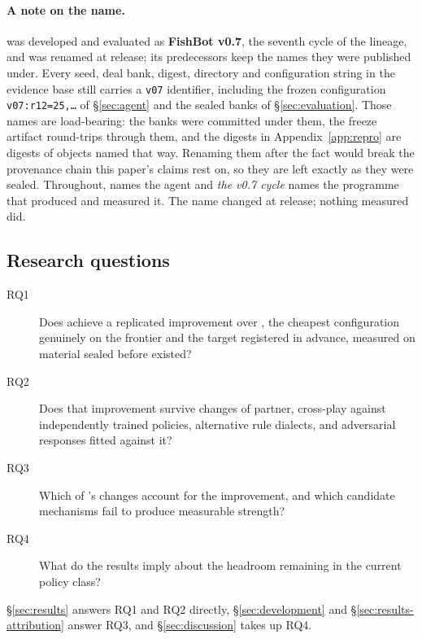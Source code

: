 \paragraph{A note on the name.} \sestina{} was developed and evaluated as \textbf{FishBot v0.7},
the seventh cycle of the lineage, and was renamed at release; its predecessors keep the names they
were published under. Every seed, deal bank, digest, directory and configuration string in the
evidence base still carries a \texttt{v07} identifier, including the frozen configuration
\texttt{v07:r12=25,\ldots} of \S\ref{sec:agent} and the sealed banks of \S\ref{sec:evaluation}.
Those names are load-bearing: the banks were committed under them, the freeze artifact round-trips
through them, and the digests in Appendix~\ref{app:repro} are digests of objects named that
way. Renaming them after the fact would break the provenance chain this paper's claims rest on, so
they are left exactly as they were sealed. Throughout, \emph{\sestina{}} names the agent and
\emph{the v0.7 cycle} names the programme that produced and measured it. The name changed at
release; nothing measured did.

\subsection{Research questions}
\label{sec:intro-rq}

\begin{description}
\item[RQ1] Does \sestina{} achieve a replicated improvement over \fcheap{}, the cheapest
  configuration genuinely on the \vsix{} frontier and the target registered in advance, measured on
  material sealed before \sestina{} existed?
\item[RQ2] Does that improvement survive changes of partner, cross-play against independently trained
  policies, alternative rule dialects, and adversarial responses fitted against it?
\item[RQ3] Which of \sestina{}'s changes account for the improvement, and which candidate
  mechanisms fail to produce measurable strength?
\item[RQ4] What do the results imply about the headroom remaining in the current policy class?
\end{description}

\S\ref{sec:results} answers RQ1 and RQ2 directly, \S\ref{sec:development} and
\S\ref{sec:results-attribution} answer RQ3, and \S\ref{sec:discussion} takes up RQ4.

